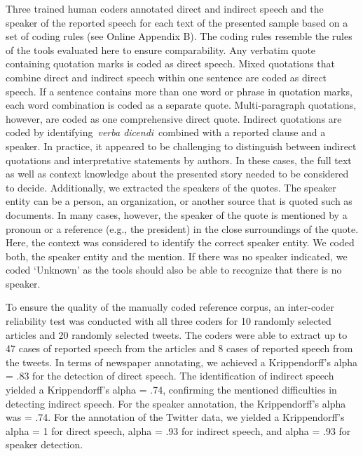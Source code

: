 \documentclass{ccr}
\begin{document}
Three trained human coders annotated direct and indirect speech and the
speaker of the reported speech for each text of the presented sample
based on a set of coding rules (see Online Appendix B). The coding rules
resemble the rules of the tools evaluated here to ensure comparability.
Any verbatim quote containing quotation marks is coded as direct speech.
Mixed quotations that combine direct and indirect speech within one
sentence are coded as direct speech. If a sentence contains more than
one word or phrase in quotation marks, each word combination is coded as
a separate quote. Multi-paragraph quotations, however, are coded as one
comprehensive direct quote. Indirect quotations are coded by
identifying~\textit{verba dicendi}~combined with a reported clause and a
speaker. In practice, it appeared to be challenging to distinguish
between indirect quotations and interpretative statements by authors. In
these cases, the full text as well as context knowledge about the
presented story needed to be considered to decide. Additionally, we
extracted the speakers of the quotes. The speaker entity can be a
person, an organization, or another source that is quoted such as
documents. In many cases, however, the speaker of the quote is mentioned
by a pronoun or a reference (e.g., the president) in the close
surroundings of the quote. Here, the context was considered to identify
the correct speaker entity. We coded both, the speaker entity and the
mention. If there was no speaker indicated, we coded `Unknown' as the
tools should also be able to recognize that there is no speaker.

To ensure the quality of the manually coded reference corpus, an
inter-coder reliability test was conducted with all three coders for 10
randomly selected articles and 20 randomly selected tweets. The coders
were able to extract up to 47 cases of reported speech from the articles
and 8 cases of reported speech from the tweets. In terms of newspaper
annotating, we achieved a Krippendorff's alpha = .83 for the detection
of direct speech. The identification of indirect speech yielded a
Krippendorff's alpha = .74, confirming the mentioned difficulties in
detecting indirect speech. For the speaker annotation, the
Krippendorff's alpha was = .74. For the annotation of the Twitter
data, we yielded a Krippendorff's alpha = 1 for direct speech, alpha = .93
for indirect speech, and alpha = .93 for speaker detection.
\end{document}
